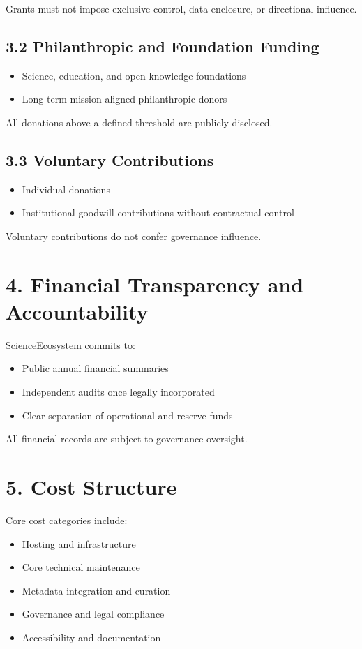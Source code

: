 Grants must not impose exclusive control, data enclosure, or directional influence.

\subsection*{3.2 Philanthropic and Foundation Funding}
\begin{itemize}
    \item Science, education, and open-knowledge foundations
    \item Long-term mission-aligned philanthropic donors
\end{itemize}

All donations above a defined threshold are publicly disclosed.

\subsection*{3.3 Voluntary Contributions}
\begin{itemize}
    \item Individual donations
    \item Institutional goodwill contributions without contractual control
\end{itemize}

Voluntary contributions do not confer governance influence.

\section*{4. Financial Transparency and Accountability}

ScienceEcosystem commits to:
\begin{itemize}
    \item Public annual financial summaries
    \item Independent audits once legally incorporated
    \item Clear separation of operational and reserve funds
\end{itemize}

All financial records are subject to governance oversight.

\section*{5. Cost Structure}

Core cost categories include:
\begin{itemize}
    \item Hosting and infrastructure
    \item Core technical maintenance
    \item Metadata integration and curation
    \item Governance and legal compliance
    \item Accessibility and documentation
\end{itemize}

